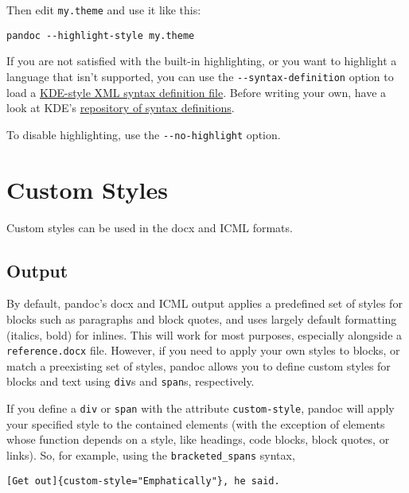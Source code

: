 Then edit \texttt{my.theme} and use it like this:

\begin{verbatim}
pandoc --highlight-style my.theme
\end{verbatim}

If you are not satisfied with the built-in highlighting, or you want to
highlight a language that isn't supported, you can use the
\texttt{-\/-syntax-definition} option to load a
\href{https://docs.kde.org/stable5/en/kate/katepart/highlight.html}{KDE-style
XML syntax definition file}. Before writing your own, have a look at
KDE's
\href{https://github.com/KDE/syntax-highlighting/tree/master/data/syntax}{repository
of syntax definitions}.

To disable highlighting, use the \texttt{-\/-no-highlight} option.

\hypertarget{custom-styles}{%
\section{Custom Styles}\label{custom-styles}}

Custom styles can be used in the docx and ICML formats.

\hypertarget{output}{%
\subsection{Output}\label{output}}

By default, pandoc's docx and ICML output applies a predefined set of
styles for blocks such as paragraphs and block quotes, and uses largely
default formatting (italics, bold) for inlines. This will work for most
purposes, especially alongside a \texttt{reference.docx} file. However,
if you need to apply your own styles to blocks, or match a preexisting
set of styles, pandoc allows you to define custom styles for blocks and
text using \texttt{div}s and \texttt{span}s, respectively.

If you define a \texttt{div} or \texttt{span} with the attribute
\texttt{custom-style}, pandoc will apply your specified style to the
contained elements (with the exception of elements whose function
depends on a style, like headings, code blocks, block quotes, or links).
So, for example, using the \texttt{bracketed\_spans} syntax,

\begin{verbatim}
[Get out]{custom-style="Emphatically"}, he said.
\end{verbatim}

